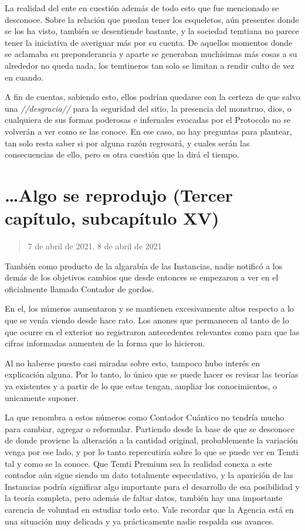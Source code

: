 \documentclass[
  spanish,
]{book}
\begin{document}
La realidad del ente en cuestión además de todo esto que fue mencionado se desconoce. Sobre la relación que puedan tener los esqueletos, aún presentes donde se los ha visto, también se desentiende bastante, y la sociedad temtiana no parece tener la iniciativa de averiguar más por su cuenta. De aquellos momentos donde se aclamaba su preponderancia y aparte se generaban muchísimas más cosas a su alrededor no queda nada, los temtineros tan solo se limitan a rendir culto de vez en cuando.

A fin de cuentas, sabiendo esto, ellos podrían quedarse con la certeza de que salvo una \emph{//desgracia//} para la seguridad del sitio, la presencia del monstruo, dios, o cualquiera de sus formas poderosas e infernales evocadas por el Protocolo no se volverán a ver como se las conoce. En ese caso, no hay preguntas para plantear, tan solo resta saber si por alguna razón regresará, y cuales serán las consecuencias de ello, pero es otra cuestión que la dirá el tiempo.

\hypertarget{algo-se-reprodujo-tercer-capuxedtulo-subcapuxedtulo-xv}{%
\section{\ldots Algo se reprodujo (Tercer capítulo, subcapítulo XV)}\label{algo-se-reprodujo-tercer-capuxedtulo-subcapuxedtulo-xv}}

\begin{quote}
7 de abril de 2021, 8 de abril de 2021
\end{quote}

También como producto de la algarabía de las Instancias, nadie notificó a los demás de los objetivos cambios que desde entonces se empezaron a ver en el oficialmente llamado Contador de gordos.

En el, los números aumentaron y se mantienen excesivamente altos respecto a lo que se venía viendo desde hace rato. Los anones que permanecen al tanto de lo que ocurre en el exterior no registraron antecedentes relevantes como para que las cifras informadas aumenten de la forma que lo hicieron.

Al no haberse puesto casi miradas sobre esto, tampoco hubo interés en explicación alguna. Por lo tanto, lo único que se puede hacer es revisar las teorías ya existentes y a partir de lo que estas tengan, ampliar los conocimientos, o unicamente suponer.

La que renombra a estos números como Contador Cuántico no tendría mucho para cambiar, agregar o reformular. Partiendo desde la base de que se desconoce de donde proviene la alteración a la cantidad original, probablemente la variación venga por ese lado, y por lo tanto repercutiría sobre lo que se puede ver en Temti tal y como se la conoce. Que Temti Premium sea la realidad conexa a este contador aún sigue siendo un dato totalmente especulativo, y la aparición de las Instancias podría significar algo importante para el desarrollo de esa posibilidad y la teoría completa, pero además de faltar datos, también hay una importante carencia de voluntad en estudiar todo esto. Vale recordar que la Agencia está en una situación muy delicada y ya prácticamente nadie respalda sus avances.
\end{document}
